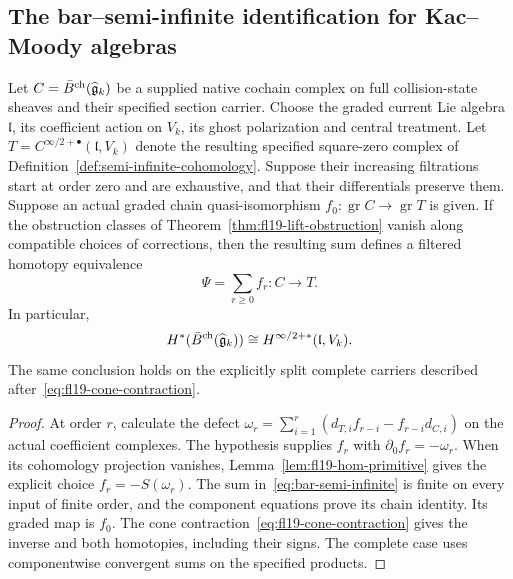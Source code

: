 \subsection{The bar--semi-infinite identification for Kac--Moody algebras}

\begin{theorem}
\label{thm:bar-semi-infinite-km}
Let $C=\bar B^{\mathrm{ch}}(\widehat{\mathfrak{g}}_k)$ be a supplied native cochain complex on full collision-state sheaves and their specified section carrier.
Choose the graded current Lie algebra $\mathfrak l$, its coefficient action on $V_k$, its ghost polarization and central treatment. Let $T=C^{\infty/2+\bullet}(\mathfrak l,V_k)$ denote the resulting specified square-zero complex of Definition~\ref{def:semi-infinite-cohomology}.
Suppose their increasing filtrations start at order zero and are exhaustive, and that their differentials preserve them.
Suppose an actual graded chain quasi-isomorphism $f_0:\operatorname{gr}C\to\operatorname{gr}T$ is given.
If the obstruction classes of Theorem~\ref{thm:fl19-lift-obstruction} vanish along compatible choices of corrections, then the resulting sum defines a filtered homotopy equivalence
\begin{equation}\label{eq:bar-semi-infinite}
\Psi=\sum_{r\ge0}f_r:C\longrightarrow T.
\end{equation}
In particular,
\begin{equation}\label{eq:bar-equals-semi-infinite}
H^*(\bar B^{\mathrm{ch}}(\widehat{\mathfrak{g}}_k))
\cong H^{\infty/2+*}(\mathfrak l,V_k).
\end{equation}
The same conclusion holds on the explicitly split complete carriers described after~\eqref{eq:fl19-cone-contraction}.
\end{theorem}
\begin{proof}
At order $r$, calculate the defect
$\omega_r=\sum_{i=1}^r(d_{T,i}f_{r-i}-f_{r-i}d_{C,i})$ on the actual coefficient complexes.
The hypothesis supplies $f_r$ with $\partial_0 f_r=-\omega_r$.
When its cohomology projection vanishes, Lemma~\ref{lem:fl19-hom-primitive} gives the explicit choice $f_r=-S(\omega_r)$.
The sum in~\eqref{eq:bar-semi-infinite} is finite on every input of finite order, and the component equations prove its chain identity.
Its graded map is $f_0$.
The cone contraction~\eqref{eq:fl19-cone-contraction} gives the inverse and both homotopies, including their signs.
The complete case uses componentwise convergent sums on the specified products.
\end{proof}

